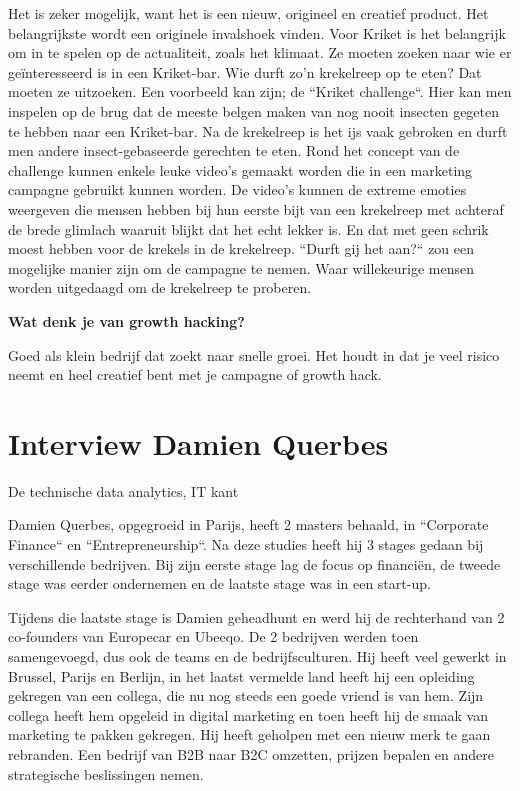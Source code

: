 Het is zeker mogelijk, want het is een nieuw, origineel en creatief product. Het belangrijkste wordt een originele invalshoek vinden. Voor Kriket is het belangrijk om in te spelen op de actualiteit, zoals het klimaat. Ze moeten zoeken naar wie er geïnteresseerd is in een Kriket-bar. Wie durft zo'n krekelreep op te eten? Dat moeten ze uitzoeken. Een voorbeeld kan zijn; de ``Kriket challenge``. Hier kan men inspelen op de brug dat de meeste belgen maken van nog nooit insecten gegeten te hebben naar een Kriket-bar. Na de krekelreep is het ijs vaak gebroken en durft men andere insect-gebaseerde gerechten te eten. Rond het concept van de challenge kunnen enkele leuke video's gemaakt worden die in een marketing campagne gebruikt kunnen worden. De video's kunnen de extreme emoties weergeven die mensen hebben bij hun eerste bijt van een krekelreep met achteraf de brede glimlach waaruit blijkt dat het echt lekker is. En dat met geen schrik moest hebben voor de krekels in de krekelreep. ``Durft gij het aan?`` zou een mogelijke manier zijn om de campagne te nemen. Waar willekeurige mensen worden uitgedaagd om de krekelreep te proberen.

\textbf{Wat denk je van growth hacking?}

Goed als klein bedrijf dat zoekt naar snelle groei. Het houdt in dat je veel risico neemt en heel creatief bent met je campagne of growth hack.
	


\section{Interview Damien Querbes}
\label{sec:interview-damien}

De technische data analytics, IT kant

Damien Querbes, opgegroeid in Parijs, heeft 2 masters behaald, in ``Corporate Finance`` en ``Entrepreneurship``. Na deze studies heeft hij 3 stages gedaan bij verschillende bedrijven. Bij zijn eerste stage lag de focus op financiën, de tweede stage was eerder ondernemen en de laatste stage was in een start-up. 

Tijdens die laatste stage is Damien geheadhunt en werd hij de rechterhand van 2 co-founders van Europecar en Ubeeqo. De 2 bedrijven werden toen samengevoegd, dus ook de teams en de bedrijfsculturen. Hij heeft veel gewerkt in Brussel, Parijs en Berlijn, in het laatst vermelde land heeft hij een opleiding gekregen van een collega, die nu nog steeds een goede vriend is van hem. Zijn collega heeft hem opgeleid in digital marketing en toen heeft hij de smaak van marketing te pakken gekregen. Hij heeft geholpen met een nieuw merk te gaan rebranden. Een bedrijf van B2B naar B2C omzetten, prijzen bepalen en andere strategische beslissingen nemen.

